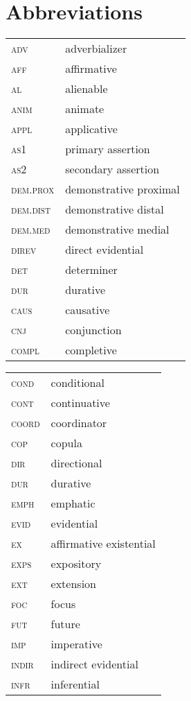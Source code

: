 \documentclass[output=paper,draft,draftmode,colorlinks,citecolor=brown]{langscibook}
\begin{document}
\section*{Abbreviations}
\begin{tabularx}{.5\textwidth}{lQ}
    \textsc{adv}& adverbializer\\
    \textsc{aff}& affirmative\\
    \textsc{al}& alienable\\
    \textsc{anim}& animate\\
    \textsc{appl}& applicative\\
    \textsc{as1}& primary assertion\\
    \textsc{as2}& secondary assertion\\
    \textsc{dem.prox}& demonstrative proximal\\
    \textsc{dem.dist}& demonstrative distal\\
    \textsc{dem.med}& demonstrative medial\\
    \textsc{direv}& direct evidential\\ 
    \textsc{det}& determiner\\
    \textsc{dur}& durative\\
    \textsc{caus}& causative\\
    \textsc{cnj}& conjunction\\
    \textsc{compl}& completive\\
\end{tabularx}
\begin{tabularx}{.45\textwidth}{lQ}
    \textsc{cond}& conditional\\
    \textsc{cont}& continuative\\
    \textsc{coord}& coordinator\\
    \textsc{cop}& copula\\
    \textsc{dir}& directional\\
    \textsc{dur}& durative\\
    \textsc{emph}& emphatic\\
    \textsc{evid}& evidential\\
    \textsc{ex}& affirmative existential\\
    \textsc{exps}& expository\\
    \textsc{ext}& extension\\
    \textsc{foc}& focus\\
    \textsc{fut}& future\\
    \textsc{imp}& imperative\\ 
    \textsc{indir}& indirect evidential\\ 
    \textsc{infr}& inferential\\
\end{tabularx}
\end{document}
